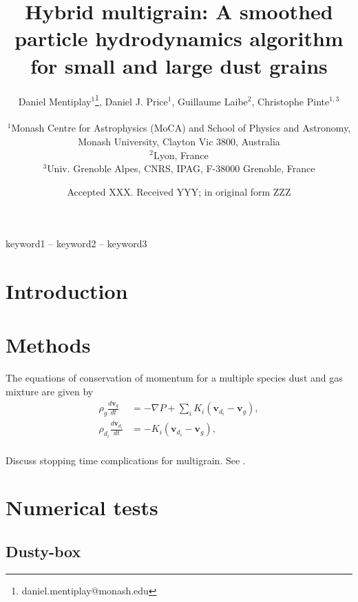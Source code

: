\documentclass[fleqn,usenatbib]{mnras}
\title[Hybrid multigrain]{Hybrid multigrain: A smoothed particle hydrodynamics
algorithm for small and large dust grains}
\author[Mentiplay, Price, Laibe, \& Pinte]{%
   \parbox{\textwidth}{%
      Daniel Mentiplay$^{1}$\thanks{daniel.mentiplay@monash.edu},
      Daniel J. Price$^{1}$,
      Guillaume Laibe$^{2}$,
      Christophe Pinte$^{1,3}$}\\
   $^{1}$Monash Centre for Astrophysics (MoCA) and School of Physics and
   Astronomy, Monash University, Clayton Vic 3800, Australia \\
   $^{2}$Lyon, France \\
   $^{3}$Univ. Grenoble Alpes, CNRS, IPAG, F-38000 Grenoble, France}
\date{Accepted XXX. Received YYY; in original form ZZZ}
\let\vec\mathbf
\begin{document}
\label{firstpage}
\pagerange{\pageref{firstpage}--\pageref{lastpage}}
\maketitle

\begin{abstract}
\end{abstract}

\begin{keywords}
keyword1 -- keyword2 -- keyword3
\end{keywords}



\section{Introduction}

\section{Methods}

The equations of conservation of momentum for a multiple species dust and gas
mixture are given by
%
\begin{align}
   \rho_g \frac{d \vec{v}_g}{dt} &= - \nabla P + \sum_i K_i \left(\vec{v}_{d_i}
                                    - \vec{v}_{g}\right), \\
   \rho_{d_i} \frac{d \vec{v}_{d_i}}{dt} &= - K_i \left(\vec{v}_{d_i}
                                                       - \vec{v}_{g}\right),
\end{align}
%
\\
Discuss stopping time complications for multigrain. See \citet{Hutchison:2018}.

\section{Numerical tests}

\subsection{Dusty-box}
\end{document}
